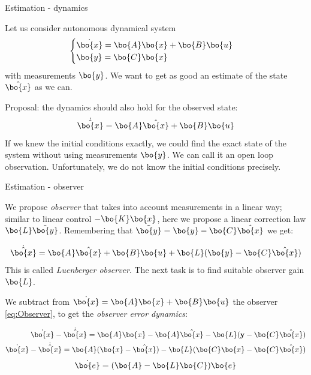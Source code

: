 \documentclass{beamer}
\begin{document}
\begin{frame}{Estimation - dynamics}
\begin{flushleft}

Let us consider autonomous dynamical system
\begin{equation}
\label{eq:LTI}
\begin{cases}
\dot {\bo{x}} = \bo{A} \bo{x} + \bo{B} \bo{u} \\
\bo{y} = \bo{C} \bo{x}
\end{cases}
\end{equation}
%
with measurements $\bo{y}$. We want to get as good an estimate of the state $\hat{\bo{x}}$ as we can.

\bigskip

Proposal: the dynamics should also hold for the observed state:
\begin{equation}
\dot{\hat{\bo{x}}} = \bo{A} \hat{\bo{x}} + \bo{B} \bo{u}
\end{equation}
%
If we knew the initial conditions exactly, we could find the exact state of the system without using measurements $\bo{y}$. We can call it an open loop observation. Unfortunately, we do not know the initial conditions precisely.


\end{flushleft}
\end{frame}





\begin{frame}{Estimation - observer}
\begin{flushleft}

We propose \emph{observer} that takes into account measurements in a linear way; similar to linear control $-\bo{K}\bo{x}$, here we propose a linear correction law $\bo{L}\Tilde{\bo{y}}$. Remembering that $\Tilde{\bo{y}} = \bo{y} -  \bo{C} \hat{\bo{x}} $ we get:

\begin{equation}
\label{eq:Observer}
\dot{\hat{\bo{x}}}  = \bo{A} \hat{\bo{x}} + \bo{B} \bo{u} + \bo{L}(\bo{y} - \bo{C} \hat{\bo{x}})
\end{equation}
%
This is called \emph{Luenberger observer}. The next task is to find suitable observer gain $ \bo{L}$.

\bigskip


We subtract from $\dot {\bo{x}} = \bo{A} \bo{x} + \bo{B} \bo{u}$ the observer \eqref{eq:Observer}, to get the \emph{observer error dynamics}:

\begin{align}
	\dot {\bo{x}} - \dot{\hat{\bo{x}}} = 
	\bo{A} \bo{x} - \bo{A} \hat{\bo{x}} - 
	\bo{L}(\mathbf y - \bo{C} \hat{\bo{x}})
	\\
	\dot {\bo{x}} - \dot{\hat{\bo{x}}}
	= 
	\bo{A} (\bo{x} -   \hat{\bo{x}} ) - 
	\bo{L}(\bo{C} \bo{x} -  \bo{C}\hat{\bo{x}}  ) 
\end{align}
%
\begin{equation}
\dot {\bo{e} }= (\bo{A} - \bo{L} \bo{C})\bo{e} 
\end{equation}

\end{flushleft}
\end{frame}
\end{document}
